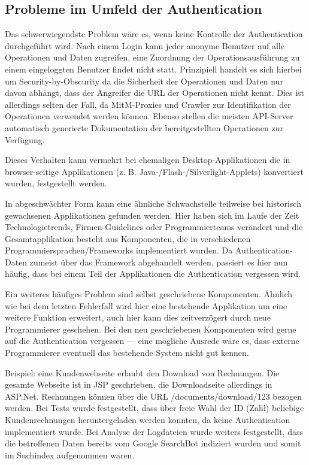 \subsection{Probleme im Umfeld der Authentication}

Das schwerwiegendste Problem wäre es, wenn keine Kontrolle der Authentication durchgeführt wird. Nach einem Login kann jeder anonyme Benutzer auf alle Operationen und Daten zugreifen, eine Zuordnung der Operationsausführung zu einem eingeloggten Benutzer findet nicht statt. Prinzipiell handelt es sich hierbei um Security-by-Obscurity da die Sicherheit der Operationen und Daten nur davon abhängt, dass der Angreifer die URL der Operationen nicht kennt. Dies ist allerdings selten der Fall, da MitM-Proxies und Crawler zur Identifikation der Operationen verwendet werden können. Ebenso stellen die meisten API-Server automatisch generierte Dokumentation der bereitgestellten Operationen zur Verfügung.

Dieses Verhalten kann vermehrt bei ehemaligen Desktop-Applikationen die in browser-seitige Applikationen (z. B. Java-/Flash-/Silverlight-Applets) konvertiert wurden, festgestellt werden.

In abgeschwächter Form kann eine ähnliche Schwachstelle teilweise bei historisch gewachsenen Applikationen gefunden werden. Hier haben sich im Laufe der Zeit Technologietrends, Firmen-Guidelines oder Programmierteams verändert und die Gesamtapplikation besteht aus Komponenten, die in verschiedenen Programmiersprachen/Frameworks implementiert wurden. Da Authentication-Daten zumeist über das Framework abgehandelt werden, passiert es hier nun häufig, dass bei einem Teil der Applikationen die Authentication vergessen wird.

Ein weiteres häufiges Problem sind selbst geschriebene Komponenten. Ähnlich wie bei dem letzten Fehlerfall wird hier eine bestehende Applikation um eine weitere Funktion erweitert, auch hier kann dies zeitverzögert durch neue Programmierer geschehen. Bei den neu geschriebenen Komponenten wird gerne auf die Authentication vergessen --- eine mögliche Ausrede wäre es, dass externe Programmierer eventuell das bestehende System nicht gut kennen.

Beispiel: eine Kundenwebseite erlaubt den Download von Rechnungen. Die gesamte Webseite ist in JSP geschrieben, die Downloadseite allerdings in ASP.Net. Rechnungen können über die URL /documents/download/123 bezogen werden. Bei Tests wurde festgestellt, dass über freie Wahl der ID (Zahl) beliebige Kundenrechnungen heruntergeladen werden konnten, da keine Authentication implementiert wurde. Bei Analyse der Logdateien wurde weiters festgestellt, dass die betroffenen Daten bereits vom Google SearchBot indiziert wurden und somit im Suchindex aufgenommen waren.

